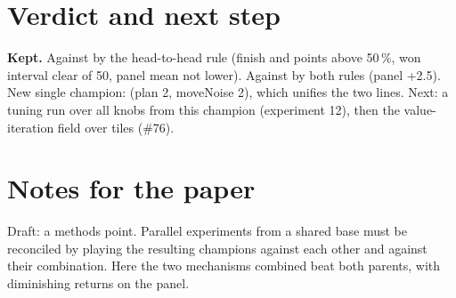 \documentclass{../polyexp}
\begin{document}
\section{Verdict and next step}
\textbf{Kept.} Against  by the head-to-head rule (finish and points above 50\,\%, won interval clear of 50, panel mean not lower). Against  by both rules (panel +2.5). New single champion:  (plan 2, moveNoise 2), which unifies the two lines. Next: a tuning run over all knobs from this champion (experiment 12), then the value-iteration field over tiles (\#76).

\section{Notes for the paper}
Draft: a methods point. Parallel experiments from a shared base must be reconciled by playing the resulting champions against each other and against their combination. Here the two mechanisms combined beat both parents, with diminishing returns on the panel.

\end{document}
